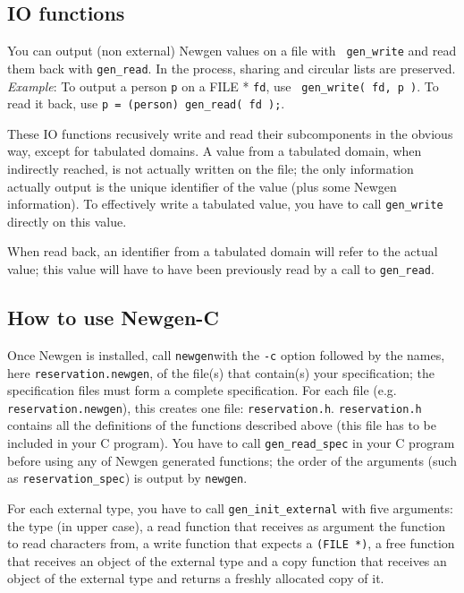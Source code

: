 \subsection{IO functions}

You can output (non external) Newgen values on a file with {\tt
gen\_write} and read them back with {\tt gen\_read}. In the process,
sharing and circular lists are preserved.
{\em Example}: To output a person {\tt p} on a FILE * {\tt fd}, use {\tt
gen\_write( fd, p )}. To read it back, use {\tt p = (person) gen\_read( fd
);}. 

These IO functions recusively write and read their subcomponents in the
obvious way, except for tabulated domains. A value from a tabulated
domain, when indirectly reached, is not actually written on the file;
the only information actually output is the unique identifier of the
value (plus some Newgen information). To effectively write a tabulated
value, you have to call {\tt gen\_write} directly on this value.

When read back, an identifier from a tabulated domain will refer to the
actual value; this value will have to have been previously read by a
call to {\tt gen\_read}.

\subsection{How to use Newgen-C}

Once Newgen is installed, call {\tt newgen}with the {\tt -c} option
followed by the names, here {\tt reservation.newgen}, of the file(s)
that contain(s) your specification; the specification files must form a
complete specification. For each file (e.g. {\tt reservation.newgen}),
this creates one file: {\tt reservation.h}. {\tt reservation.h} contains
all the definitions of the functions described above (this file has to
be included in your C program).  You have to call {\tt gen\_read\_spec}
in your C program before using any of Newgen generated functions; the
order of the arguments (such as {\tt reservation\_spec}) is output by
{\tt newgen}.

For each external type, you have to call {\tt gen\_init\_external} with
five arguments: the type (in upper case), a read function that receives
as argument the function to read characters from, a write function that
expects a {\tt (FILE *)}, a free function that receives an object of
the external type and a copy function that receives an object of the
external type and returns a freshly allocated copy of it.

